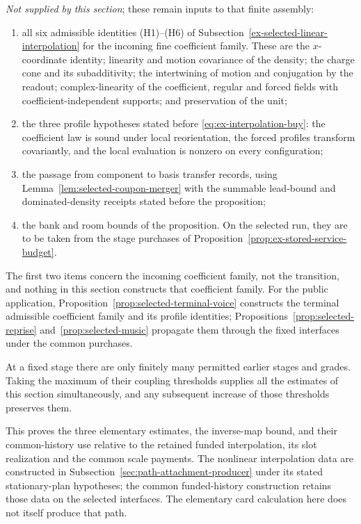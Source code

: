 \emph{Not supplied by this section}; these remain inputs to that
finite assembly:
\begin{enumerate}
\item[(i)] all six admissible identities (H1)--(H6) of
      Subsection~\ref{ex-selected-linear-interpolation} for the incoming
      fine coefficient family. These are the $x$-coordinate identity; linearity and
      motion covariance of the density; the charge cone and its
      subadditivity; the intertwining of motion and conjugation by the
      readout; complex-linearity of the coefficient, regular and
      forced fields with coefficient-independent supports; and
      preservation of the unit;
\item[(ii)] the three profile hypotheses stated before
      \eqref{eq:ex-interpolation-buy}: the coefficient law is sound
      under local reorientation, the forced profiles transform
      covariantly, and the local evaluation is nonzero on every
      configuration;
\item[(iii)] the passage from component to basis transfer records, using
      Lemma~\ref{lem:selected-coupon-merger} with the summable lead-bound
      and dominated-density receipts stated before the proposition;
\item[(iv)] the bank and room bounds of the proposition. On the
      selected run, they are to be taken from the stage purchases of
      Proposition~\ref{prop:ex-stored-service-budget}.
\end{enumerate}
The first two items concern the incoming coefficient family, not the transition,
and nothing in this section constructs that coefficient family.
For the public application, Proposition~\ref{prop:selected-terminal-voice}
constructs the terminal admissible coefficient family and its profile identities;
Propositions~\ref{prop:selected-reprise} and~\ref{prop:selected-music}
propagate them through the fixed interfaces under the common purchases.

At a fixed stage there are only finitely many permitted earlier
stages and grades. Taking the maximum of their coupling thresholds
supplies all the estimates of this section simultaneously, and any
subsequent increase of those thresholds preserves them.

This proves the three elementary estimates, the inverse-map bound,
and their common-history use relative to the retained funded
interpolation, its slot realization and the common scale payments.
The nonlinear interpolation data are constructed in
Subsection~\ref{sec:path-attachment-producer} under its stated stationary-plan
hypotheses; the common funded-history construction retains those data on
the selected interfaces. The elementary card calculation here does not itself
produce that path.
